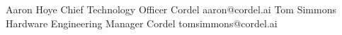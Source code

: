%
%
%


\begin{referees}
		{Aaron Hoye}
		{Chief Technology Officer}
		{Cordel}
		{aaron@cordel.ai}
		{Tom Simmons}
		{Hardware Engineering Manager}
		{Cordel}
		{tomsimmons@cordel.ai}
\end{referees}
